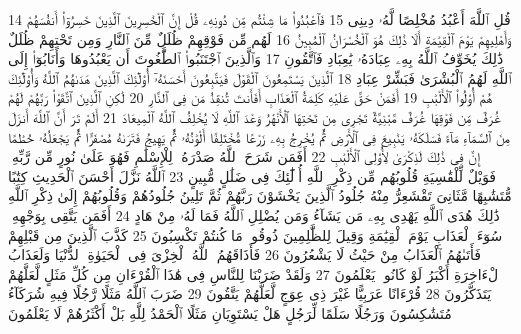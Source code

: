 {\tiny\colorbox{cl_aya}{14}} قُلِ ٱللَّهَ أَعْبُدُ مُخْلِصًا لَّهُۥ دِينِى
{\tiny\colorbox{cl_aya}{15}} فَٱعْبُدُوا۟ مَا شِئْتُم مِّن دُونِهِۦ قُلْ إِنَّ ٱلْخَٰسِرِينَ ٱلَّذِينَ خَسِرُوٓا۟ أَنفُسَهُمْ وَأَهْلِيهِمْ يَوْمَ ٱلْقِيَٰمَةِ أَلَا ذَٰلِكَ هُوَ ٱلْخُسْرَانُ ٱلْمُبِينُ
{\tiny\colorbox{cl_aya}{16}} لَهُم مِّن فَوْقِهِمْ ظُلَلٌ مِّنَ ٱلنَّارِ وَمِن تَحْتِهِمْ ظُلَلٌ ذَٰلِكَ يُخَوِّفُ ٱللَّهُ بِهِۦ عِبَادَهُۥ يَٰعِبَادِ فَٱتَّقُونِ
{\tiny\colorbox{cl_aya}{17}} وَٱلَّذِينَ ٱجْتَنَبُوا۟ ٱلطَّٰغُوتَ أَن يَعْبُدُوهَا وَأَنَابُوٓا۟ إِلَى ٱللَّهِ لَهُمُ ٱلْبُشْرَىٰ فَبَشِّرْ عِبَادِ
{\tiny\colorbox{cl_aya}{18}} ٱلَّذِينَ يَسْتَمِعُونَ ٱلْقَوْلَ فَيَتَّبِعُونَ أَحْسَنَهُۥٓ أُو۟لَٰٓئِكَ ٱلَّذِينَ هَدَىٰهُمُ ٱللَّهُ وَأُو۟لَٰٓئِكَ هُمْ أُو۟لُوا۟ ٱلْأَلْبَٰبِ
{\tiny\colorbox{cl_aya}{19}} أَفَمَنْ حَقَّ عَلَيْهِ كَلِمَةُ ٱلْعَذَابِ أَفَأَنتَ تُنقِذُ مَن فِى ٱلنَّارِ
{\tiny\colorbox{cl_aya}{20}} لَٰكِنِ ٱلَّذِينَ ٱتَّقَوْا۟ رَبَّهُمْ لَهُمْ غُرَفٌ مِّن فَوْقِهَا غُرَفٌ مَّبْنِيَّةٌ تَجْرِى مِن تَحْتِهَا ٱلْأَنْهَٰرُ وَعْدَ ٱللَّهِ لَا يُخْلِفُ ٱللَّهُ ٱلْمِيعَادَ
{\tiny\colorbox{cl_aya}{21}} أَلَمْ تَرَ أَنَّ ٱللَّهَ أَنزَلَ مِنَ ٱلسَّمَآءِ مَآءً فَسَلَكَهُۥ يَنَٰبِيعَ فِى ٱلْأَرْضِ ثُمَّ يُخْرِجُ بِهِۦ زَرْعًا مُّخْتَلِفًا أَلْوَٰنُهُۥ ثُمَّ يَهِيجُ فَتَرَىٰهُ مُصْفَرًّا ثُمَّ يَجْعَلُهُۥ حُطَٰمًا إِنَّ فِى ذَٰلِكَ لَذِكْرَىٰ لِأُو۟لِى ٱلْأَلْبَٰبِ
{\tiny\colorbox{cl_aya}{22}} أَفَمَن شَرَحَ ٱللَّهُ صَدْرَهُۥ لِلْإِسْلَٰمِ فَهُوَ عَلَىٰ نُورٍ مِّن رَّبِّهِۦ فَوَيْلٌ لِّلْقَٰسِيَةِ قُلُوبُهُم مِّن ذِكْرِ ٱللَّهِ أُو۟لَٰٓئِكَ فِى ضَلَٰلٍ مُّبِينٍ
{\tiny\colorbox{cl_aya}{23}} ٱللَّهُ نَزَّلَ أَحْسَنَ ٱلْحَدِيثِ كِتَٰبًا مُّتَشَٰبِهًا مَّثَانِىَ تَقْشَعِرُّ مِنْهُ جُلُودُ ٱلَّذِينَ يَخْشَوْنَ رَبَّهُمْ ثُمَّ تَلِينُ جُلُودُهُمْ وَقُلُوبُهُمْ إِلَىٰ ذِكْرِ ٱللَّهِ ذَٰلِكَ هُدَى ٱللَّهِ يَهْدِى بِهِۦ مَن يَشَآءُ وَمَن يُضْلِلِ ٱللَّهُ فَمَا لَهُۥ مِنْ هَادٍ
{\tiny\colorbox{cl_aya}{24}} أَفَمَن يَتَّقِى بِوَجْهِهِۦ سُوٓءَ ٱلْعَذَابِ يَوْمَ ٱلْقِيَٰمَةِ وَقِيلَ لِلظَّٰلِمِينَ ذُوقُوا۟ مَا كُنتُمْ تَكْسِبُونَ
{\tiny\colorbox{cl_aya}{25}} كَذَّبَ ٱلَّذِينَ مِن قَبْلِهِمْ فَأَتَىٰهُمُ ٱلْعَذَابُ مِنْ حَيْثُ لَا يَشْعُرُونَ
{\tiny\colorbox{cl_aya}{26}} فَأَذَاقَهُمُ ٱللَّهُ ٱلْخِزْىَ فِى ٱلْحَيَوٰةِ ٱلدُّنْيَا وَلَعَذَابُ ٱلْءَاخِرَةِ أَكْبَرُ لَوْ كَانُوا۟ يَعْلَمُونَ
{\tiny\colorbox{cl_aya}{27}} وَلَقَدْ ضَرَبْنَا لِلنَّاسِ فِى هَٰذَا ٱلْقُرْءَانِ مِن كُلِّ مَثَلٍ لَّعَلَّهُمْ يَتَذَكَّرُونَ
{\tiny\colorbox{cl_aya}{28}} قُرْءَانًا عَرَبِيًّا غَيْرَ ذِى عِوَجٍ لَّعَلَّهُمْ يَتَّقُونَ
{\tiny\colorbox{cl_aya}{29}} ضَرَبَ ٱللَّهُ مَثَلًا رَّجُلًا فِيهِ شُرَكَآءُ مُتَشَٰكِسُونَ وَرَجُلًا سَلَمًا لِّرَجُلٍ هَلْ يَسْتَوِيَانِ مَثَلًا ٱلْحَمْدُ لِلَّهِ بَلْ أَكْثَرُهُمْ لَا يَعْلَمُونَ
